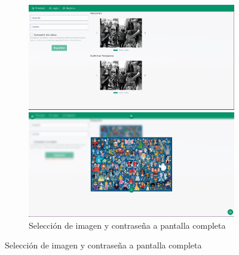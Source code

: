 \begin{anexos}
\begin{figure}
	\begin{figure}[H]
		\centering
		\begin{minipage}[b]{0.48\linewidth}  %
			\centering
			\includegraphics[width=\linewidth]{Graphics/capturas/registro-landscape.png}
			\caption{Pantalla de registro en vista escritorio }
			\label{register-screen}
		\end{minipage}%
		\hfill
		\begin{minipage}[b]{0.48\linewidth} %
			\centering
			\includegraphics[width=\linewidth]{Graphics/capturas/fullscreen-password-selector.png}
			\caption{Selecci\'on de imagen y contrase\~na a pantalla completa }   
			\label{full-screen-password}       
		\end{minipage}
		
	\end{figure} 
	

\end{figure}
\end{anexos}
